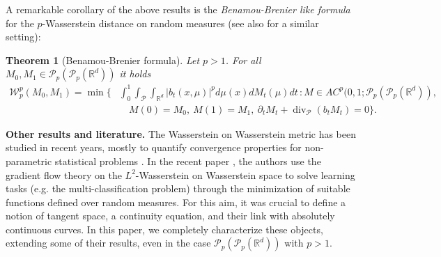 \documentclass[10pt,leqno]{amsart}
\numberwithin{equation}{section}
\newtheorem{teorema}{Theorem}[section]
\newcommand{\R}{\mathbb{R}}
\newcommand{\PP}{\mathcal{P}}
\begin{document}
A remarkable corollary of the above results is the \textit{Benamou-Brenier like formula} for the $p$-Wasserstein distance on random measures
(see also \cite{HUESMANN2025104633} for a similar setting):
\begin{teorema}[Benamou-Brenier formula]\label{thm: BB}
    Let $p>1$. For all $M_0,M_1\in \PP_p(\PP_p(\R^d))$ it holds
    \begin{equation}\label{eq: BB intro}
    \begin{aligned}
        \mathcal{W}_p^p(M_0,M_1) = \operatorname{min}\bigg\{
        &\int_0^1 \int_{\PP}\int_{\R^d} |b_t(x,\mu)|^p d\mu(x)dM_t(\mu)dt \, :
        M\in AC^p(0,1;\PP_p(\PP_p(\R^d)),
        \\&\quad 
        M(0)=M_0,\ M(1)=M_1,\ 
        \partial_t M_t + \operatorname{div}_\PP(b_tM_t) = 0 \bigg\}.
    \end{aligned}
    \end{equation}
\end{teorema}

\noindent
\textbf{Other results and literature.} 
The Wasserstein on Wasserstein metric has been studied in recent years, mostly to quantify convergence properties for non-parametric statistical problems \cite{nguyen2016borrowing, catalano2024hierarchical}. In the recent paper \cite{bonet2025flowing}, the authors use the gradient flow theory on the $L^2$-Wasserstein on Wasserstein space to solve learning tasks (e.g. the multi-classification problem) through the minimization of suitable functions defined over random measures. For this aim, it was crucial to define a notion of tangent space, a continuity equation, and their link with absolutely continuous curves. In this paper, we completely characterize these objects, extending some of their results, even in the case $\PP_p(\PP_p(\R^d))$ with $p>1$. 
\end{document}
